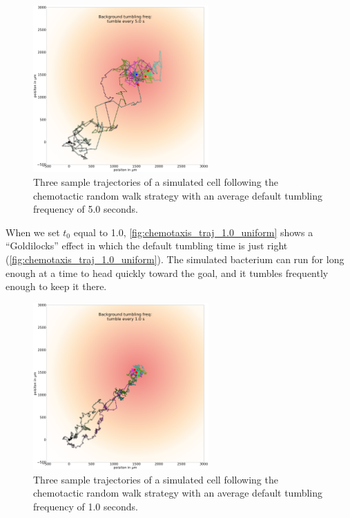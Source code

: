 \begin{figure}[h]
\centering
\mySfFamily
\includegraphics[width = 0.6\textwidth]{../images/chemotaxis_traj_5.0_uniform.png}
\caption{Three sample trajectories of a simulated cell following the chemotactic random walk strategy with an average default tumbling frequency of 5.0 seconds.}
\label{fig:chemotaxis_traj_5.0_uniform}
\end{figure}


When we set $t_0$ equal to 1.0, \autoref{fig:chemotaxis_traj_1.0_uniform} shows a ``Goldilocks'' effect in which the default tumbling time is just right (\autoref{fig:chemotaxis_traj_1.0_uniform}). The simulated bacterium can run for long enough at a time to head quickly toward the goal, and it tumbles frequently enough to keep it there.

\begin{figure}[h]
\centering
\mySfFamily
\includegraphics[width = 0.6\textwidth]{../images/chemotaxis_traj_1.0_uniform.png}
\caption{Three sample trajectories of a simulated cell following the chemotactic random walk strategy with an average default tumbling frequency of 1.0 seconds.}
\label{fig:chemotaxis_traj_1.0_uniform}
\end{figure}


